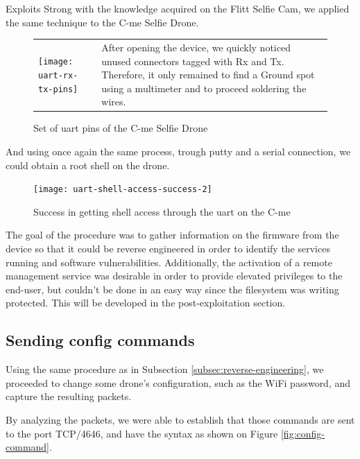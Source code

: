\begin{chaptercover}{Exploits}
Strong with the knowledge acquired on the Flitt Selfie Cam, we applied the same technique to the C-me Selfie Drone.

\begin{figure}[H]
\begin{center}
\begin{tabular}{m{9cm}m{8.3cm}}
  \texttt{[image: uart-rx-tx-pins]}
  \caption{Set of \acrshort{uart} pins of the C-me Selfie Drone}
  & After opening the device, we quickly noticed unused connectors tagged with Rx and Tx. Therefore, it only remained to find a Ground spot using a multimeter and to proceed soldering the wires. \\
\end{tabular}
\end{center}
\end{figure}

\vspace{-1cm}
And using once again the same process, trough putty and a serial connection, we could obtain a root shell on the drone.

\begin{figure}[H]
  \centering
  \texttt{[image: uart-shell-access-success-2]}
  \caption{Success in getting shell access through the \acrshort{uart} on the C-me}
  \label{fig:uart-shell-access-success-2}
\end{figure}

The goal of the procedure was to gather information on the firmware from the device so that it could be reverse engineered in order to identify the services running and software vulnerabilities. Additionally, the activation of a remote management service was desirable in order to provide elevated privileges to the end-user, but couldn’t be done in an easy way since the filesystem was writing protected. This will be developed in the post-exploitation section.

\subsection{Sending config commands}

Using the same procedure as in Subsection \ref{subsec:reverse-engineering}, we proceeded to change some drone's configuration, such as the WiFi password, and capture the resulting packets.

By analyzing the packets, we were able to establish that those commands are sent to the port TCP/4646, and have the syntax as shown on Figure \ref{fig:config-command}.


\end{chaptercover}
